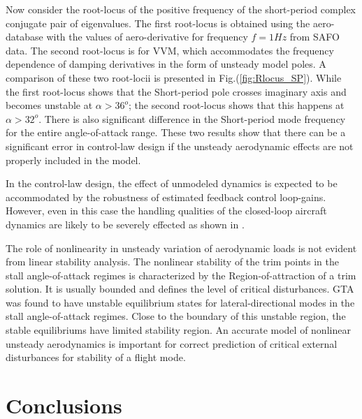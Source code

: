 \documentclass{AIAA}
\begin{document}
Now consider the root-locus of the positive frequency of the short-period complex conjugate pair of eigenvalues. The first root-locus is obtained using the aero-database with the values of aero-derivative for frequency $f= 1 Hz$ from SAFO data. The second root-locus is for VVM, which accommodates the frequency dependence of damping derivatives in the form of unsteady model poles. A comparison of these two root-locii is presented in Fig.(\ref{fig:Rlocus_SP}). While the first root-locus shows that the Short-period pole crosses imaginary axis and becomes unstable at $\alpha > 36^o$; the second root-locus shows that this happens at $\alpha > 32^o$. There is also significant difference in the Short-period mode frequency for the entire angle-of-attack range. These two results show that there can be a significant error in control-law design if the unsteady aerodynamic effects are not properly included in the model.

In the control-law design, the effect of unmodeled dynamics is expected to be accommodated by the robustness of estimated feedback control loop-gains. However, even in this case the handling qualities of the closed-loop aircraft dynamics are likely to be severely effected as shown in \cite{Abramov2}.

The role of nonlinearity in unsteady variation of aerodynamic loads is not evident from linear stability analysis. The nonlinear stability of the trim points in the stall angle-of-attack regimes is characterized by the Region-of-attraction of a trim solution. It is usually bounded and defines the level of critical disturbances. GTA was found to have unstable equilibrium states for lateral-directional modes in the stall angle-of-attack regimes. Close to the boundary of this unstable region, the stable equilibriums have limited stability region. An accurate model of nonlinear unsteady aerodynamics is important for correct prediction of critical external disturbances for stability of a flight mode.

\section{Conclusions}



%
%
\end{document}
